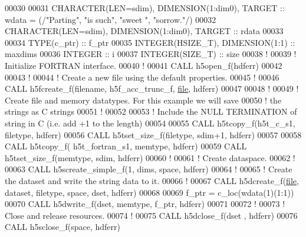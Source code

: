 \begin{DoxyCode}
00030 
00031   \textcolor{keywordtype}{CHARACTER(LEN=sdim)}, \textcolor{keywordtype}{DIMENSION(1:dim0)}, \textcolor{keywordtype}{TARGET} :: wdata = (/\textcolor{stringliteral}{"Parting"}, \textcolor{stringliteral}{"is such"}, \textcolor{stringliteral}{"sweet  "}, \textcolor{stringliteral}{"sorrow."}/)
00032   \textcolor{keywordtype}{CHARACTER(LEN=sdim)}, \textcolor{keywordtype}{DIMENSION(1:dim0)}, \textcolor{keywordtype}{TARGET} :: rdata
00033 
00034   \textcolor{keywordtype}{TYPE}(c\_ptr) :: f\_ptr
00035   \textcolor{keywordtype}{INTEGER(HSIZE\_T)}, \textcolor{keywordtype}{DIMENSION(1:1)} :: maxdims
00036   \textcolor{keywordtype}{INTEGER} :: i
00037   \textcolor{keywordtype}{INTEGER(SIZE\_T)} :: size
00038   \textcolor{comment}{!}
00039   \textcolor{comment}{! Initialize FORTRAN interface.}
00040   \textcolor{comment}{!}
00041   \textcolor{keyword}{CALL }h5open\_f(hdferr)
00042 
00043   \textcolor{comment}{!}
00044   \textcolor{comment}{! Create a new file using the default properties.}
00045   \textcolor{comment}{!}
00046   \textcolor{keyword}{CALL }h5fcreate\_f(filename, h5f\_acc\_trunc\_f, \hyperlink{structfile}{file}, hdferr)
00047 
00048   \textcolor{comment}{!}
00049   \textcolor{comment}{! Create file and memory datatypes.  For this example we will save}
00050   \textcolor{comment}{! the strings as C strings}
00051   \textcolor{comment}{!}
00052   
00053   \textcolor{comment}{! Include the NULL TERMINATION of string in C (i.e. add +1 to the length)}
00054 
00055   \textcolor{keyword}{CALL }h5tcopy\_f(h5t\_c\_s1, filetype, hdferr)
00056   \textcolor{keyword}{CALL }h5tset\_size\_f(filetype, sdim+1, hdferr)
00057 
00058   \textcolor{keyword}{CALL }h5tcopy\_f( h5t\_fortran\_s1, memtype, hdferr)
00059   \textcolor{keyword}{CALL }h5tset\_size\_f(memtype, sdim, hdferr)
00060   \textcolor{comment}{!}
00061   \textcolor{comment}{! Create dataspace.}
00062   \textcolor{comment}{!}
00063   \textcolor{keyword}{CALL }h5screate\_simple\_f(1, dims, space, hdferr)
00064   \textcolor{comment}{!}
00065   \textcolor{comment}{! Create the dataset and write the string data to it.}
00066   \textcolor{comment}{!}
00067   \textcolor{keyword}{CALL }h5dcreate\_f(\hyperlink{structfile}{file}, dataset, filetype, space, dset, hdferr)
00068 
00069   f\_ptr = c\_loc(wdata(1)(1:1))
00070   \textcolor{keyword}{CALL }h5dwrite\_f(dset, memtype, f\_ptr, hdferr)
00071 
00072   \textcolor{comment}{!}
00073   \textcolor{comment}{! Close and release resources.}
00074   \textcolor{comment}{!}
00075   \textcolor{keyword}{CALL }h5dclose\_f(dset , hdferr)
00076   \textcolor{keyword}{CALL }h5sclose\_f(space, hdferr)

\end{DoxyCode}

